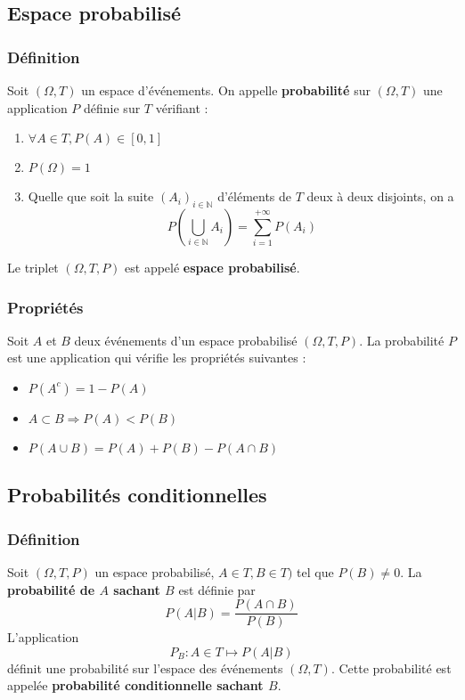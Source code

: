 \documentclass[10pt,a4paper,twoside]{article}
\begin{document}
\subsection{Espace probabilisé}
\subsubsection{Définition}
Soit $(\Omega,T)$ un espace d'événements. On appelle \textbf{probabilité} sur $(\Omega,T)$ une application $P$ définie sur $T$ vérifiant :
\begin{enumerate}
\item $\forall A\in T, P(A)\in [0,1]$
\item $P(\Omega)=1$
\item Quelle que soit la suite $(A_{i})_{i\in \mathbb{N}}$ d'éléments de $T$ deux à deux disjoints, on a
$$P\left(\bigcup_{i\in \mathbb{N}}A_{i}\right)=\sum_{i=1}^{+\infty}P(A_{i})$$
\end{enumerate}
Le triplet $(\Omega,T,P)$ est appelé \textbf{espace probabilisé}.

\subsubsection{Propriétés}
Soit $A$ et $B$ deux événements d'un espace probabilisé $(\Omega,T,P)$. La probabilité $P$ est une application qui vérifie les propriétés suivantes :
\begin{itemize}
\item $P(A^{c})=1-P(A)$
\item $A\subset B \Rightarrow P(A)<P(B)$
\item $P(A\cup B) = P(A) + P(B) - P(A\cap B)$
\end{itemize}

\subsection{Probabilités conditionnelles}
\subsubsection{Définition}
Soit $(\Omega, T, P)$ un espace probabilisé, $A\in T, B\in T)$ tel que $P(B)\neq 0$. La \textbf{probabilité de $A$ sachant $B$} est définie par
$$P(A|B)=\frac{P(A\cap B)}{P(B)}$$
L'application
$$P_{B} : A\in T \longmapsto P(A|B)$$
définit une probabilité sur l'espace des événements $(\Omega,T)$. Cette probabilité est appelée \textbf{probabilité conditionnelle sachant $B$}.
\end{document}
